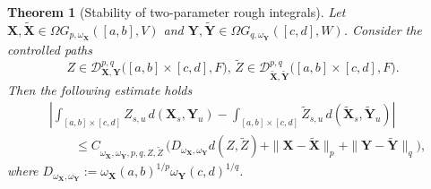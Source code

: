 \documentclass{article}%
\newtheorem{theorem}{Theorem}
\begin{document}
\begin{theorem}[Stability of two-parameter rough integrals]\label{stability_theorem_2D}
Let $\mathbf{X}, \tilde{\mathbf{X}} \in  \Omega G_{p, \omega_{\mathbf{X}}}([a,b], V)$ and $\mathbf{Y}, \tilde{\mathbf{Y}} \in  \Omega G_{q, \omega_\mathbf{Y}} ([c,d], W)$. Consider the controlled paths
\[
Z \in \mathcal{D}^{p, q}_{\mathbf{X}, \mathbf{Y}}\big([a, b] \times [c,d], F\big), \, \tilde{Z}\in \mathcal{D}^{p, q}_{\tilde{\mathbf{X}}, \tilde{\mathbf{Y}}}\big([a, b] \times [c,d], F\big).
\] 
Then the following estimate holds
\begin{align*}
&\left| \int_{[a,b] \times [c,d]} Z_{s, u} \, d(\mathbf{X}_s, \mathbf{Y}_u) 
      - \int_{[a,b] \times [c,d]} \tilde{Z}_{s, u} \, d(\tilde{\mathbf{X}}_s, \tilde{\mathbf{Y}}_u) \right|\\
&\qquad \leq C_{\omega_\mathbf{X}, \omega_\mathbf{Y}, p, q, Z, \tilde{Z}} 
\, \Big( D_{\omega_{\mathbf{X}}, \omega_{\mathbf{Y}}} d( Z, \tilde{Z} ) + \|\mathbf{X} - \tilde{\mathbf{X}}\|_{p} + \|\mathbf{Y} - \tilde{\mathbf{Y}}\|_{q} \Big),
\end{align*}
where $D_{\omega_{\mathbf{X}}, \omega_{\mathbf{Y}}} := \omega_{\mathbf{X}}(a,b)^{1/p} \omega_{\mathbf{Y}}(c,d)^{1/q}$.

\end{theorem}
\end{document}
